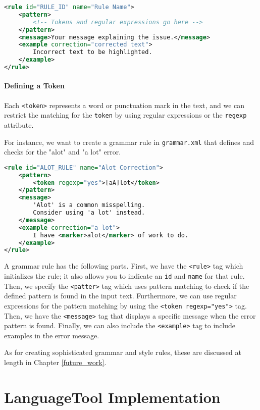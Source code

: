 \begin{lstlisting}[language=XML, caption=Boilerplate Code for a Simple Rule]
<rule id="RULE_ID" name="Rule Name">
    <pattern>
        <!-- Tokens and regular expressions go here -->
    </pattern>
    <message>Your message explaining the issue.</message>
    <example correction="corrected text">
        Incorrect text to be highlighted.
    </example>
</rule>    
\end{lstlisting}

\paragraph{Defining a Token} Each \texttt{<token>} represents a word or punctuation mark in the text, and we can restrict the matching for the \texttt{token} by using regular expressions or the \texttt{regexp} attribute.

For instance, we want to create a grammar rule in \texttt{grammar.xml} that defines and checks for the "alot" and "a lot" error.

\begin{lstlisting}[language= XML, caption=Example Grammar Rule for "alot" v. "a lot"]
<rule id="ALOT_RULE" name="Alot Correction">
    <pattern>
        <token regexp="yes">[aA]lot</token>
    </pattern>
    <message>
        'Alot' is a common misspelling. 
        Consider using 'a lot' instead.
    </message>
    <example correction="a lot">
        I have <marker>alot</marker> of work to do.
    </example>
</rule>
\end{lstlisting}

A grammar rule has the following parts. First, we have the \texttt{<rule>} tag which initializes the rule; it also allows you to indicate an \texttt{id} and \texttt{name} for that rule. Then, we specify the \texttt{<patter>} tag which uses pattern matching to check if the defined pattern is found in the input text. Furthermore, we can use regular expressions for the pattern matching by using the \texttt{<token regexp="yes">} tag. Then, we have the \texttt{<message>} tag that displays a specific message when the error pattern is found. Finally, we can also include the \texttt{<example>} tag to include examples in the error message.

As for creating sophisticated grammar and style rules, these are discussed at length in Chapter \ref{future_work}.

\section{LanguageTool Implementation}

